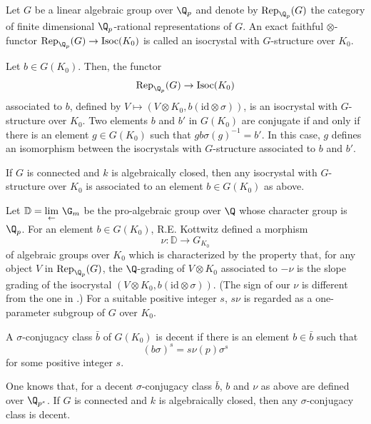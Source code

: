 \begin{apppara}
 Let $G$ be a linear algebraic group over $\Q_p$ and
 denote by
 $\mathrm{Rep}_{\Q_p}(G)$ the category of
 finite dimensional $\Q_p$-rational representations of $G$.
 An exact faithful $\otimes$-functor
 $\mathrm{Rep}_{\Q_p}(G) \rightarrow \mathrm{Isoc}(K_0)$
 is called an isocrystal with $G$-structure over $K_0$.

 Let $b \in G(K_0)$. Then, the functor
 $$
   \mathrm{Rep}_{\Q_p}(G)
                                        \rightarrow \mathrm{Isoc}(K_0)
 $$
 associated to $b$,
 defined by $V \mapsto (V \otimes K_0, b(\mathrm{id} \otimes \sigma))$,
 is an isocrystal with $G$-structure over $K_0$. \cite{iwas}
 Two elements $b$ and $b'$ in $G(K_0)$ are conjugate
 if and only if there is an element $g \in G(K_0)$ such that
 $gb\sigma(g)^{-1} = b'$.
 In this case, $g$ defines an isomorphism between the isocrystals with
 $G$-structure associated to $b$ and $b'$.

 If $G$ is connected and $k$ is algebraically closed,
 then any  isocrystal with $G$-structure over $K_0$ is associated to
 an element $b \in G(K_0)$ as above. \cite{otcasofwas}
\end{apppara}

\begin{apppara}
 \label{sfil}
 Let $\mathbb{D} = \displaystyle{\mathop{\lim}_\leftarrow}\ \G_m$
 be the pro-algebraic group over $\Q$
 whose character group is $\Q_p$. For an element $b \in G(K_0)$,
 R.E. Kottwitz defined a morphism
 $$
      \nu : \mathbb{D} \rightarrow G_{K_0}
 $$
 of algebraic groups over $K_0$ which is characterized by the property
 that, for any object $V$ in $\mathrm{Rep}_{\Q_p}(G)$,
 the $\Q$-grading of $V \otimes K_0$ associated to $- \nu$ is the
 slope grading of the isocrystal
 $(V \otimes K_0, b(\mathrm{id} \otimes \sigma))$.
 (The sign of our $\nu$ is different from the one in \cite{iwas}.)
 For a suitable positive integer $s$, $s\nu$ is regarded
 as a one-parameter subgroup of $G$ over $K_0$.
\end{apppara}

\begin{appdfn}
 \label{decent} A $\sigma$-conjugacy class $\bar{b}$
 of $G(K_0)$ is decent if there is an element $b \in \bar{b}$ such that
 $$
          (b\sigma)^s = s\nu(p)\sigma^s
 $$
 for some positive integer $s$.
\end{appdfn}

One knows that, for a decent $\sigma$-conjugacy class $\bar{b}$, $b$ and $\nu$
as above are defined over $\Q_{p^s}$.
If $G$ is connected and $k$ is algebraically closed, then any
$\sigma$-conjugacy
class is decent. \cite{iwas}


